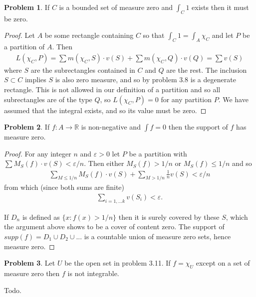 \documentclass[20pt]{article}
\theoremstyle{plain}
\theoremstyle{definition}
\newtheorem*{problem}{Problem}
\newcommand{\reals}{\mathbb{R}}
\begin{document}
\begin{problem}{3.17}
  If $C$ is a bounded set of measure zero and $\int_C 1$ exists then it must be zero.
\end{problem}

\begin{proof}
  Let $A$ be some rectangle containing $C$ so that $\int_C 1 = \int_A \chi_C$
  and let $P$ be a partition of $A$.  Then
  \begin{align*}
    L(\chi_C, P) =
    \sum m(\chi_C, S)\cdot v(S) + \sum m(\chi_C, Q) \cdot v(Q) =
    \sum v(S)
  \end{align*}
  where $S$ are the subrectangles contained in $C$ and $Q$ are the rest.
  The inclusion $S \subset C$ implies $S$ is also zero measure, and
  so by problem 3.8 is a degenerate rectangle. This is not allowed in
  our definition of a partition and so all subrectangles
  are of the type $Q$, so $L(\chi_C, P) = 0$ for any partition $P$.
  We have assumed that the integral exists, and so its value must be zero.
\end{proof}


\begin{problem}{3.18}
  If $f: A\to\reals$ is non-negative and $\int f = 0$ then the
  support of $f$ has measure zero.
\end{problem}

\begin{proof}
  For any integer $n$ and $\varepsilon > 0$ let $P$ be a partition with
  $\sum M_S(f)\cdot v(S) < \varepsilon/n.$
  Then either $M_S(f) > 1/n$ or $M_S(f) \leq 1/n$ and so
  \begin{align*}
    \sum_{M\leq 1/n} M_S(f) \cdot v(S) + \sum_{M > 1/n} \frac{1}{n}v(S) <
    \varepsilon/n
  \end{align*}
  from which (since both sums are finite)
  \begin{align*}
    \sum_{i = 1,...k} v(S_i) < \varepsilon.
  \end{align*}

  If $D_n$ is defined as  $\{ x: f(x) > 1 / n \}$ then it is surely covered by these
  $S$, which the argument above shows to be a cover of content zero.
  The support of $supp(f) = D_1 \cup D_2 \cup ...$ is a countable union of
  measure zero sets, hence measure zero.
\end{proof}


\begin{problem}{3.19}
  Let $U$ be the open set in problem 3.11.
  If $f = \chi_U$ except on a set of measure zero then $f$ is not integrable.
\end{problem}
\color{Blue}
Todo.
\color{Black}
\end{document}
